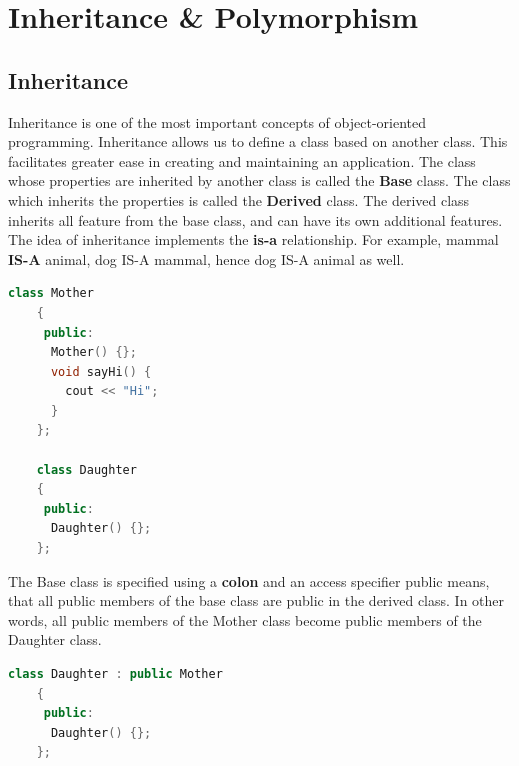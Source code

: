 \documentclass[12pt , a4paper]{article}
\begin{document}
%
%
\section{Inheritance \& Polymorphism}

	\subsection{Inheritance}
	Inheritance is one of the most important concepts of object-oriented programming.
	Inheritance allows us to define a class based on another class. This facilitates greater ease in creating and maintaining an application.
	The class whose properties are inherited by another class is called the \textbf{Base} class. The class which inherits the properties is called the \textbf{Derived} class. The derived class inherits all feature from the base class, and can have its own additional features.\\
	The idea of inheritance implements the \textbf{is-a} relationship. For example, mammal \textbf{IS-A} animal, dog IS-A mammal, hence dog IS-A animal as well.\\
	\begin{lstlisting}[language=C++]
	class Mother
	{
	 public:
	  Mother() {};
	  void sayHi() {
	    cout << "Hi";
	  } 
	};
	
	class Daughter 
	{
	 public: 
	  Daughter() {};
	};
	\end{lstlisting}
	The Base class is specified using a \textbf{colon} and an access specifier public means, that all public members of the base class are public in the derived class.
	In other words, all public members of the Mother class become public members of the Daughter class.

	\begin{lstlisting}[language=C++]
	class Daughter : public Mother
	{
	 public: 
	  Daughter() {};
	};

	\end{lstlisting}
\end{document}
